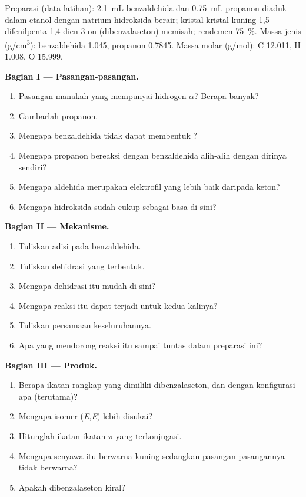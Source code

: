 \begin{problem}
\label{pb:b2:enolates-aldol:1}
Preparasi (data latihan): \qty{2.1}{mL} benzaldehida dan \qty{0.75}{mL}
propanon diaduk dalam etanol dengan natrium hidroksida berair; kristal-kristal
kuning 1,5-difenilpenta-1,4-dien-3-on (dibenzalaseton) memisah; rendemen
75~\%. Massa jenis (\unit{g/cm^3}): benzaldehida 1.045, propanon 0.7845.
Massa molar (\unit{g/mol}): C 12.011, H 1.008, O 15.999.

\medskip
\noindent\textbf{Bagian I --- Pasangan-pasangan.}
\begin{enumerate}
  \item Pasangan manakah yang mempunyai hidrogen $\alpha$? Berapa banyak?
  \item Gambarlah  propanon.
  \item Mengapa benzaldehida tidak dapat membentuk ?
  \item Mengapa propanon bereaksi dengan benzaldehida alih-alih dengan dirinya sendiri?
  \item Mengapa aldehida merupakan elektrofil yang lebih baik daripada keton?
  \item Mengapa hidroksida sudah cukup sebagai basa di sini?
\end{enumerate}

\medskip
\noindent\textbf{Bagian II --- Mekanisme.}
\begin{enumerate}[resume]
  \item Tuliskan adisi  pada benzaldehida.
  \item Tuliskan dehidrasi  yang terbentuk.
  \item Mengapa dehidrasi itu mudah di sini?
  \item Mengapa reaksi itu dapat terjadi untuk kedua kalinya?
  \item Tuliskan persamaan keseluruhannya.
  \item Apa yang mendorong reaksi itu sampai tuntas dalam preparasi ini?
\end{enumerate}

\medskip
\noindent\textbf{Bagian III --- Produk.}
\begin{enumerate}[resume]
  \item Berapa ikatan rangkap  yang dimiliki dibenzalaseton, dan
        dengan konfigurasi apa (terutama)?
  \item Mengapa isomer (\textit{E},\textit{E}) lebih disukai?
  \item Hitunglah ikatan-ikatan $\pi$ yang terkonjugasi.
  \item Mengapa senyawa itu berwarna kuning sedangkan pasangan-pasangannya tidak berwarna?
  \item Apakah dibenzalaseton kiral?
\end{enumerate}


\end{problem}
